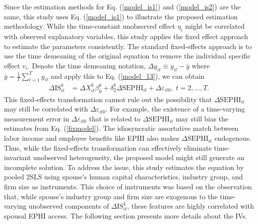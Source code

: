 \documentclass[legno,11pt]{article}
\begin{document}
Since the estimation methods for Eq. (\ref{model_is1}) and
(\ref{model_is2}) are the same, this study uses Eq.
(\ref{model_is1}) to illustrate the proposed estimation methodology.
While the time-constant unobserved effect $\eta_{i}$ might be
correlated with observed explanatory variables, this study applies
the fixed effect approach to estimate the parameters consistently.
The standard fixed-effects approach is to use the time demeaning of
the original equation to remove the individual specific effect
$v_{i}$. Denote the time demeaning notation, $\Delta y_{it}\equiv
y_{it}-\bar{y}$ where $\bar{y}=\frac{1}{T}\sum\limits_{t=1}^{T}
y_{it}$ and apply this to Eq. (\ref{model_13}),  we can obtain
\begin{align}\label{fixmodel}
 \Delta \text{IS}_{it}^{k}&=\Delta X^{k}_{it}\beta_{0}^{k}+\delta_{2}^{k}\Delta \text{SEPHI}_{it}
+\Delta\varepsilon_{it0},\;t=2,...,T.
\end{align}
This fixed-effects transformation cannot rule out the possibility
that $\Delta \text{SEPHI}_{it}$ may still be correlated with $\Delta
\varepsilon_{it0}$. For example, the existence of a time-varying
measurement error in $\Delta \varepsilon_{it0}$ that is related to
$\Delta \text{SEPHI}_{it}$ may still bias the estimates from Eq.
(\ref{fixmodel}). The idiosyncratic assortative match between labor
income and employee benefits like EPHI also makes $\Delta
\text{SEPHI}_{it}$ endogenous. Thus, while the fixed-effects
transformation can effectively eliminate time-invariant unobserved
heterogeneity, the proposed model might still generate an incomplete
solution. To address the issue, this study estimates the equation by
pooled 2SLS using spouse's human capital characteristics, industry group, and firm size as instruments. This choice of instruments
was based on the observation that, while spouse's industry group and
firm size are exogenous to the time-varying unobserved components of
$\Delta \text{IS}_{it}^{k}$, these features are highly correlated
with spousal EPHI access. The following section presents more
details about the IVs.
\end{document}
